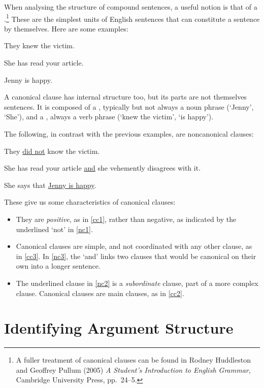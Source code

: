 When analysing the structure of compound sentences, a useful notion is that of a .\footnote{A fuller treatment of canonical clauses can be found in Rodney Huddleston and Geoffrey Pullum (2005) \emph{A Student's Introduction to English Grammar}, Cambridge University Press, pp.\ 24–5.} These are the simplest units of English sentences that can constitute a sentence by themselves. Here are some examples: 
\begin{earg}
	\item[\ex{cc1}] They knew the victim.
	\item[\ex{cc3}] She has read your article.
	\item[\ex{cc2}] Jenny is happy.
\end{earg}
A canonical clause has internal structure too, but its parts are not themselves sentences. It is composed of a , typically but not always a noun phrase (`Jenny', `She'), and a , always a verb phrase (`knew the victim', `is happy'). 

The following, in contrast with the previous examples, are noncanonical clauses: 
\begin{earg}
	\item[\ex{nc1}] They \underline{did not} know the victim.
	\item[\ex{nc3}] She has read your article \underline{and} she vehemently disagrees with it.
	\item[\ex{nc2}] She says that \underline{Jenny is happy}.
\end{earg} These give us some characteristics of canonical clauses:
\begin{itemize}
	\item They are \emph{positive}, as in \ref{cc1}, rather than negative, as indicated by the underlined `not' in \ref{nc1}.
	\item Canonical clauses are simple, and not coordinated with any other clause, as in \ref{cc3}. In \ref{nc3}, the  `and' links two clauses that would be canonical on their own into a longer  sentence.
	\item The underlined clause in \ref{nc2} is a \emph{subordinate} clause, part of a more complex clause. Canonical clauses are main clauses, as in \ref{cc2}.
\end{itemize}

\section{Identifying Argument Structure}\label{ss.idargstr}

